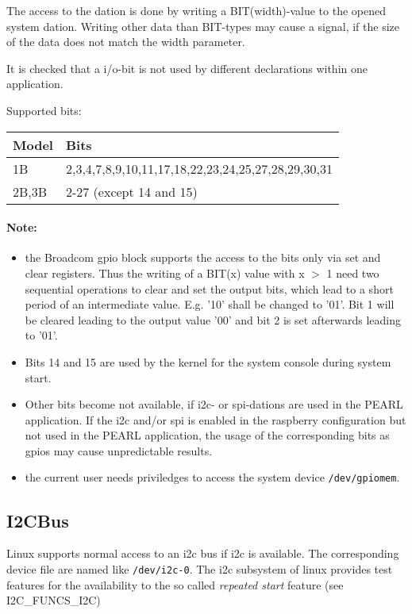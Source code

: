 The access to the dation is done by writing a BIT(width)-value to the
opened system dation. 
Writing other data than BIT-types  may cause a signal, if the size of the
data does not match the width parameter. 

It is checked that a i/o-bit is not used by different declarations within
one application.

Supported bits:

\begin{tabular}{|l|l|}
\hline
Model & Bits \\
\hline
1B & 2,3,4,7,8,9,10,11,17,18,22,23,24,25,27,28,29,30,31 \\
\hline
2B,3B & 2-27 (except 14 and 15) \\
\hline
\end{tabular}  

\paragraph{Note:} 
\begin{itemize}
\item the Broadcom gpio block supports the access to the bits only 
via set and clear registers. Thus the writing of a BIT(x) value with x $>$ 1
need two sequential operations to clear and set the output bits, which lead
to a short period of an intermediate value. E.g. '10' shall be changed to '01'. Bit 1 will be cleared leading to the output value '00' and bit 2 
is set afterwards leading to '01'.

\item Bits 14 and 15 are used by the kernel for the 
  system console during system start.
\item Other bits become not available, if i2c- or spi-dations are used
  in the PEARL application.  If the i2c and/or spi is enabled in the
  raspberry configuration but not used in the PEARL application,
  the usage of the corresponding bits 
  as gpios may cause unpredictable results.
\item the current user needs priviledges to access the system device 
  \verb|/dev/gpiomem|.
\end{itemize}
 
\subsection{I2CBus}
Linux supports normal access to an i2c bus if i2c is available. 
The corresponding device file are named like \texttt{/dev/i2c-0}.
The i2c subsystem of linux provides test features for the availability
to the so called {\em repeated start} feature (see I2C\_FUNCS\_I2C)

